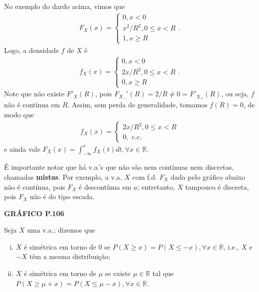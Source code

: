 \documentclass[../Notas.tex]{subfiles}
\begin{document}
\begin{example}
No exemplo do dardo acima, vimos que
\begin{align*}
    F_X(x) = \begin{cases}
    0, x < 0 \\
    x^2/R^2, 0\leq x < R \\
    1, x\geq R
    \end{cases}.
\end{align*}
Logo, a densidade $f$ de $X$ é
\begin{align*}
    f_X(x) = \begin{cases}
    0, x < 0 \\
    2x/R^2, 0\leq x < R \\
    0, x\geq R
    \end{cases}.
\end{align*}
Note que não existe $F'_X(R)$, pois $F_{X_-}'(R) = 2/R \neq 0 = F'_{X_+}(R)$, ou seja, $f$ não é contínua em $R$. Assim, sem perda de generalidade, tomamos $f(R) = 0$, de modo que
\begin{align*}
    f_X(x) = \begin{cases}
    2x/R^2, 0\leq x < R \\
    0, \text{ c.c.}
    \end{cases}
\end{align*}
e ainda vale $\displaystyle{ F_X(x) = \int_{-\infty}^x f_X(t) dt, \forall x\in\mathbb{R}. }$
\end{example}

\begin{remark}
É importante notar que há v.a.'s que não são nem contínuas nem discretas, chamadas \textbf{mistas}. Por exemplo, a v.a. $X$ com f.d. $F_X$ dada pelo gráfico abaixo não é contínua, pois $F_X$ é descontínua em $a$; entretanto, $X$ tampouco é discreta, pois $F_X$ não é do tipo escada.
\begin{center}
    \textbf{GRÁFICO P.106}
\end{center}
\end{remark}

\begin{definition}
Seja $X$ uma v.a.; dizemos que
\begin{enumerate}[(i)]
    \item $X$ é simétrica em torno de 0 se $P(X\geq x) = P(X\leq -x), \forall x\in\mathbb{R}$, i.e., $X$ e $-X$ têm a mesma distribuição;
    \item $X$ é simétrica em torno de $\mu$ se existe $\mu\in\mathbb{R}$ tal que $P(X\geq \mu + x) = P(X\leq \mu - x), \forall x\in\mathbb{R}$.
\end{enumerate}
\end{definition}
\end{document}

